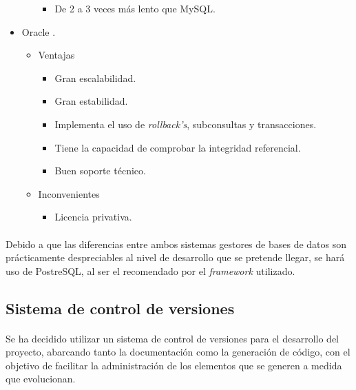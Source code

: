 \begin{itemize}
\begin{itemize}
\begin{itemize}
             \item De 2 a 3 veces más lento que MySQL.
            \end{itemize}
      \end{itemize}
      \item Oracle \cite{oracle}.
      \begin{itemize}
         \item Ventajas
            \begin{itemize}
             \item Gran escalabilidad.
             \item Gran estabilidad.
             \item Implementa el uso de \textit{rollback's}, subconsultas y
                   transacciones.
             \item Tiene la capacidad de comprobar la integridad referencial.
             \item Buen soporte técnico.
            \end{itemize}
         \item Inconvenientes
            \begin{itemize}
             \item Licencia privativa.
            \end{itemize}
      \end{itemize}
   \end{itemize}

   \paragraph{}Debido a que las diferencias entre ambos sistemas gestores de
   bases de datos son prácticamente despreciables al nivel de desarrollo que
   se pretende llegar, se hará uso de PostreSQL, al ser el recomendado por el
   \textit{framework} utilizado.

\subsection{Sistema de control de versiones}
   \paragraph{} Se ha decidido utilizar un sistema de control de versiones para
   el desarrollo del proyecto, abarcando tanto la documentación como la
   generación de código, con el objetivo de facilitar la administración de los
   elementos que se generen a medida que evolucionan.

